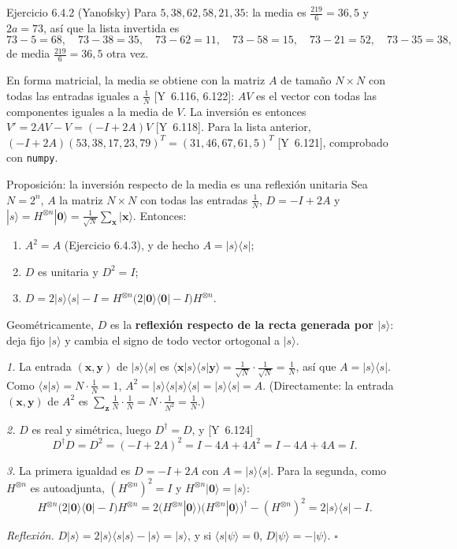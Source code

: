 \documentclass[11pt, a4paper, twoside, openright]{report}
\providecommand{\ket}[1]{|#1\rangle}
\providecommand{\bra}[1]{\langle #1|}
\providecommand{\braket}[2]{\langle #1|#2\rangle}
\newcommand{\bx}{\mathbf{x}}
\newcommand{\by}{\mathbf{y}}
\newcommand{\bz}{\mathbf{z}}
\newcommand{\bcero}{\mathbf{0}}
\newcommand{\Yan}[1]{\textcolor{rosaviejo}{\small[Y~#1]}}  %
\begin{document}
\begin{ejercicio}{Ejercicio 6.4.2 (Yanofsky)}
Para $5, 38, 62, 58, 21, 35$: la media es $\frac{219}{6} = 36{,}5$ y $2a = 73$, así que la lista invertida es
\[ 73-5 = 68, \quad 73-38 = 35, \quad 73-62 = 11, \quad 73-58 = 15, \quad 73-21 = 52, \quad 73-35 = 38, \]
de media $\frac{219}{6} = 36{,}5$ otra vez.
\end{ejercicio}

\noindent En forma matricial, la media se obtiene con la matriz $A$ de tamaño $N\times N$ con todas las entradas iguales a $\frac1N$ \Yan{6.116, 6.122}: $AV$ es el vector con todas las componentes iguales a la media de $V$. La inversión es entonces $V' = 2AV - V = (-I + 2A)V$ \Yan{6.118}. Para la lista anterior, $(-I+2A)(53, 38, 17, 23, 79)^T = (31, 46, 67, 61, 5)^T$ \Yan{6.121}, comprobado con \texttt{numpy}.

\begin{teoria}{Proposición: la inversión respecto de la media es una reflexión unitaria}
Sea $N = 2^n$, $A$ la matriz $N\times N$ con todas las entradas $\frac1N$, $D = -I + 2A$ y $\ket{s} = H^{\otimes n}\ket{\bcero} = \frac{1}{\sqrt N}\sum_{\bx}\ket{\bx}$. Entonces:
\begin{enumerate}
\item $A^2 = A$ \;(Ejercicio 6.4.3), y de hecho $A = \ket{s}\bra{s}$;
\item $D$ es unitaria y $D^2 = I$;
\item $D = 2\ket{s}\bra{s} - I = H^{\otimes n}\big(2\ket{\bcero}\bra{\bcero} - I\big)H^{\otimes n}$.
\end{enumerate}
Geométricamente, $D$ es la \textbf{reflexión respecto de la recta generada por $\ket{s}$}: deja fijo $\ket{s}$ y cambia el signo de todo vector ortogonal a $\ket{s}$.
\end{teoria}

\begin{demo}
\textit{1.} La entrada $(\bx,\by)$ de $\ket{s}\bra{s}$ es $\braket{\bx}{s}\braket{s}{\by} = \frac{1}{\sqrt N}\cdot\frac{1}{\sqrt N} = \frac1N$, así que $A = \ket{s}\bra{s}$. Como $\braket{s}{s} = N\cdot\frac1N = 1$, $A^2 = \ket{s}\braket{s}{s}\bra{s} = \ket{s}\bra{s} = A$. (Directamente: la entrada $(\bx,\by)$ de $A^2$ es $\sum_{\bz}\frac1N\cdot\frac1N = N\cdot\frac{1}{N^2} = \frac1N$.)

\textit{2.} $D$ es real y simétrica, luego $D^\dagger = D$, y \Yan{6.124}
\[ D^\dagger D = D^2 = (-I+2A)^2 = I - 4A + 4A^2 = I - 4A + 4A = I. \]

\textit{3.} La primera igualdad es $D = -I + 2A$ con $A = \ket{s}\bra{s}$. Para la segunda, como $H^{\otimes n}$ es autoadjunta, $(H^{\otimes n})^2 = I$ y $H^{\otimes n}\ket{\bcero} = \ket{s}$:
\[ H^{\otimes n}\big(2\ket{\bcero}\bra{\bcero} - I\big)H^{\otimes n} = 2\big(H^{\otimes n}\ket{\bcero}\big)\big(H^{\otimes n}\ket{\bcero}\big)^\dagger - (H^{\otimes n})^2 = 2\ket{s}\bra{s} - I. \]

\textit{Reflexión.} $D\ket{s} = 2\ket{s}\braket{s}{s} - \ket{s} = \ket{s}$, y si $\braket{s}{\psi} = 0$, $D\ket{\psi} = -\ket{\psi}$. \hfill$\square$
\end{demo}
\end{document}
